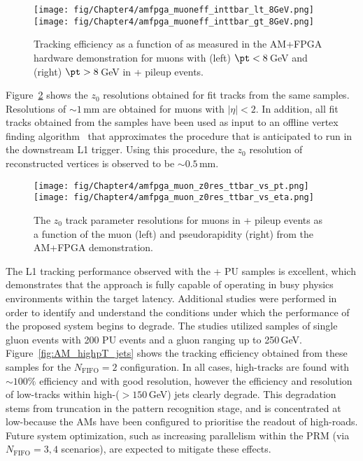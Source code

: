 \begin{figure}[t]
  \centering
\texttt{[image: fig/Chapter4/amfpga\_muoneff\_inttbar\_lt\_8GeV.png]}
\hfill
\texttt{[image: fig/Chapter4/amfpga\_muoneff\_inttbar\_gt\_8GeV.png]}
\caption{Tracking efficiency as a function of \pt as measured in the AM+FPGA hardware demonstration for muons with (left) $\pt < 8$\,GeV and (right) $\pt > 8$\,GeV in \ttbar + pileup events.} 
  \label{fig:AM_eff}
\end{figure}

Figure~\ref{fig:AM_z0res} shows the $z_{0}$ resolutions obtained for fit tracks from the same \ttbar samples. Resolutions of $\sim 1$\,mm are obtained for muons with $|\eta|<2$. In addition, all fit tracks obtained from the \ttbar samples have been used as input to an offline vertex finding algorithm~\cite{Phase2TechnicalProposal} that approximates the procedure that is anticipated to run in the downstream L1 trigger. Using this procedure, the $z_{0}$ resolution of reconstructed vertices is observed to be $\sim 0.5$\,mm.

\begin{figure}[t]
  \centering
\texttt{[image: fig/Chapter4/amfpga\_muon\_z0res\_ttbar\_vs\_pt.png]}
\hfill
\texttt{[image: fig/Chapter4/amfpga\_muon\_z0res\_ttbar\_vs\_eta.png]}
  \caption{The $z_{0}$ track parameter resolutions for muons in \ttbar + pileup events as a function of the muon \pt (left) and pseudorapidity (right) from the AM+FPGA demonstration.} 
  \label{fig:AM_z0res}
\end{figure}

The L1 tracking performance observed with the \ttbar + PU samples is excellent, which demonstrates that the approach is fully capable of operating in busy physics environments within the target latency. Additional studies were performed in order to identify and understand the conditions under which the performance of the proposed system begins to degrade. The studies utilized samples of single gluon events with 200 PU events and a gluon \pt ranging up to 250\,GeV. Figure~\ref{fig:AM_highpT_jets} shows the tracking efficiency obtained from these samples for the $N_{\text{FIFO}}=2$ configuration. In all cases, high-\pt tracks are found with $\sim 100\%$ efficiency and with good resolution, however the efficiency and resolution of low-\pt tracks within high-\pt ($> 150$\,GeV) jets clearly degrade. This degradation stems from truncation in the pattern recognition stage, and is concentrated at low-\pt because the AMs have been configured to prioritise the readout of high-\pt roads. Future system optimization, such as increasing parallelism within the PRM (\eg via $N_{\text{FIFO}}=3,4$ scenarios), are expected to mitigate these effects.

